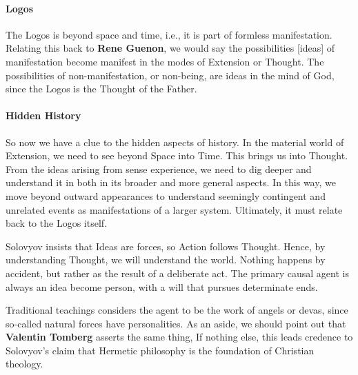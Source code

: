 \paragraph{Logos}
The Logos is beyond space and time, i.e., it is part of formless manifestation. Relating this back to \textbf{Rene Guenon}, we would say the possibilities [ideas] of manifestation become manifest in the modes of Extension or Thought. The possibilities of non-manifestation, or non-being, are ideas in the mind of God, since the Logos is the Thought of the Father.

\paragraph{Hidden History}
So now we have a clue to the hidden aspects of history. In the material world of Extension, we need to see beyond Space into Time. This brings us into Thought. From the ideas arising from sense experience, we need to dig deeper and understand it in both in its broader and more general aspects. In this way, we move beyond outward appearances to understand seemingly contingent and unrelated events as manifestations of a larger system. Ultimately, it must relate back to the Logos itself.

Solovyov insists that Ideas are forces, so Action follows Thought. Hence, by understanding Thought, we will understand the world. Nothing happens by accident, but rather as the result of a deliberate act. The primary causal agent is always an idea become person, with a will that pursues determinate ends.

Traditional teachings considers the agent to be the work of angels or devas, since so-called natural forces have personalities. As an aside, we should point out that \textbf{Valentin Tomberg} asserts the same thing, If nothing else, this leads credence to Solovyov's claim that Hermetic philosophy is the foundation of Christian theology.

